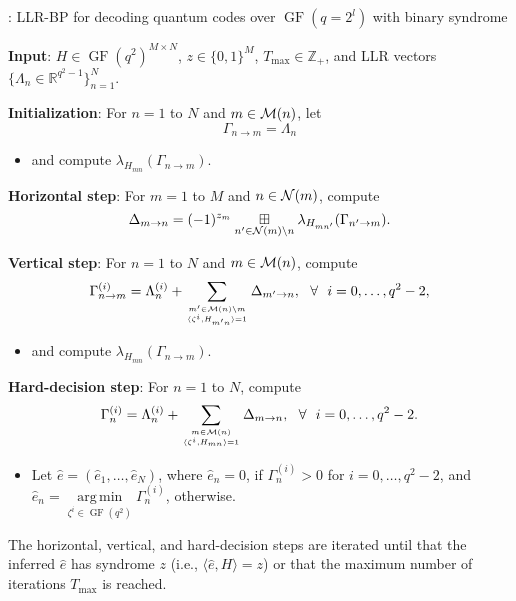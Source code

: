\documentclass{ieeeaccess}
\DeclareMathOperator*{\argmin}{arg\,min}
\DeclareMathOperator{\GF}{GF}
\newcommand{\sM}{{\cal M}}
\newcommand{\sN}{{\cal N}}
\newcommand{\RR}{{\mathbb R}}
\theoremstyle{definition}		%
\begin{document}
	\begin{algorithm}%
		\begin{flushleft}
			\caption{: LLR-BP for decoding quantum codes over $\GF(q=2^l)$ with binary syndrome} \label{alg:LLR-BP}
			
			
			{\bf Input}: 
			$H\in\GF(q^2)^{M\times N}$,  $z\in\{0,1\}^M$, $T_{\max}\in\mathbb{Z}_+$, and   LLR vectors $\{\Lambda_n\in\RR^{q^2-1}\}_{n=1}^N$.
			
			{\bf Initialization}: For $n=1$ to $N$ and $m\in\sM(n)$, let 
			$$\Gamma_{n\to m} = \Lambda_n$$
			\begin{itemize}
				\item[] and   compute $\lambda_{H_{mn}}(\Gamma_{n\to m})$.
			\end{itemize}
			
			
			{\bf Horizontal step}: For $m=1$ to $M$ and $n\in\sN(m)$, compute %
			\begin{equation} \label{eq:horiz}
			\Delta_{m\to n} = (-1)^{z_m} \underset{n'\in\sN(m)\setminus n}{\boxplus} \lambda_{H_{mn'}}(\Gamma_{n'\to m}).
			\end{equation}
			
			{\bf Vertical step}: For $n=1$ to $N$ and $m\in\sM(n)$, compute 
			\begin{equation} \label{eq:vert}
			\Gamma_{n\to m}^{(i)} = \Lambda_n^{(i)} + \sum_{m'\in\sM(n)\setminus m \atop \langle \zeta^i, H_{m'n} \rangle=1} \Delta_{m'\to n}, 
			~~\forall~~ i=0,\dots,q^2-2,
			\end{equation}
			\begin{itemize}
				\item[] and compute  $\lambda_{H_{mn}}(\Gamma_{n\to m})$.
			\end{itemize}
			
			
			{\bf Hard-decision step}: For $n=1$ to $N$, compute 
			\begin{equation} \label{eq:hard}
			\Gamma_n^{(i)} = \Lambda_n^{(i)} + \sum_{m\in\sM(n) \atop \langle \zeta^i, H_{mn} \rangle=1} \Delta_{m\to n}, ~~\forall~~ i=0,\dots,q^2-2.
			\end{equation}
			\begin{itemize}
				\item Let $\hat e = (\hat e_1, \dots, \hat e_N)$, where 
				$\hat e_n=0$, if $\Gamma_n^{(i)} > 0$ for $i=0,\dots,q^2-2$, and
				$\hat e_n=\argmin\limits_{\zeta^i\in\GF(q^2)} \Gamma_n^{(i)}$, otherwise.
			\end{itemize}
			
			The horizontal, vertical, and hard-decision steps are iterated until that 
				the inferred $\hat e$ has syndrome $z$ (i.e., $\langle \hat e, H\rangle = z$)
				or that the maximum number of iterations $T_{\max}$  is reached.
			
			
		\end{flushleft}
	\end{algorithm}
\end{document}
